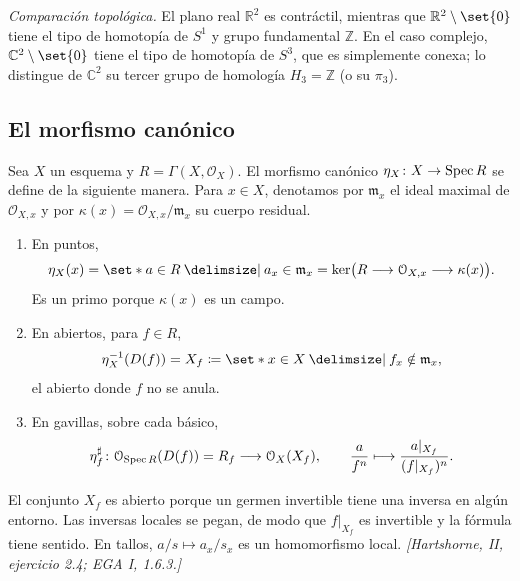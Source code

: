 \emph{Comparación topológica.} El plano real $\mathbb R^2$ es contráctil, mientras que $\mathbb R^2\setminus\set{0}$ tiene el tipo de homotopía de $S^1$ y grupo fundamental $\mathbb Z$. En el caso complejo, $\mathbb C^2\setminus\set{0}$ tiene el tipo de homotopía de $S^3$, que es simplemente conexa; lo distingue de $\mathbb C^2$ su tercer grupo de homología $H_3=\mathbb Z$ (o su $\pi_3$).

\clearpage
\subsection{El morfismo canónico}
\label{sec:s08-morfismo-canonico}

\begin{defi}
\label{defi:s08-morfismo-canonico}
Sea $X$ un esquema y $R=\Gamma(X,\mathcal O_X)$. El morfismo canónico $\eta_X\colon X\to\operatorname{Spec} R$ se define de la siguiente manera. Para $x\in X$, denotamos por $\mathfrak m_x$ el ideal maximal de $\mathcal O_{X,x}$ y por $\kappa(x)=\mathcal O_{X,x}/\mathfrak m_x$ su cuerpo residual.
\begin{enumerate}[label=(\roman*)]
\item En puntos,
\[
\eta_X(x)=\set*{a\in R\given a_x\in\mathfrak m_x}
=\ker\bigl(R\longrightarrow\mathcal O_{X,x}\longrightarrow\kappa(x)\bigr).
\]
Es un primo porque $\kappa(x)$ es un campo.
\item En abiertos, para $f\in R$,
\[
\eta_X^{-1}(D(f))=X_f
\coloneqq \set*{x\in X\given f_x\notin\mathfrak m_x},
\]
el abierto donde $f$ no se anula.
\item En gavillas, sobre cada básico,
\[
\eta_f^\sharp\colon \mathcal O_{\operatorname{Spec} R}(D(f))=R_f
\longrightarrow\mathcal O_X(X_f),
\qquad
\frac{a}{f^n}\longmapsto\frac{a|_{X_f}}{(f|_{X_f})^n}.
\]
\end{enumerate}
El conjunto $X_f$ es abierto porque un germen invertible tiene una inversa en algún entorno. Las inversas locales se pegan, de modo que $f|_{X_f}$ es invertible y la fórmula tiene sentido. En tallos, $a/s\mapsto a_x/s_x$ es un homomorfismo local. \emph{[Hartshorne, II, ejercicio 2.4; EGA I, 1.6.3.]}
\end{defi}


